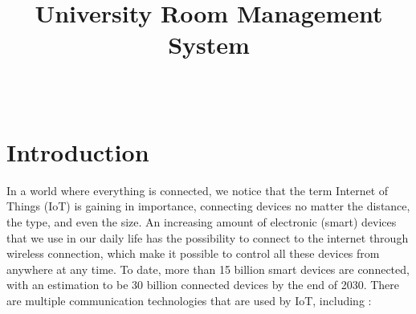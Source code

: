 \documentclass[conference,onecolumn]{IEEEtran}
\begin{document}
\title{University Room Management System\\} %

\author{\\ %

}

\maketitle


\newpage
\tableofcontents

\newpage
\section{Introduction}
In a world where everything is connected, we notice that the term Internet of Things (IoT) is gaining in importance, connecting devices no matter the distance, the type, and even the size. An increasing amount of electronic (smart) devices that we use in our daily life has the possibility to connect to the internet through wireless connection, which make it possible to control all these devices from anywhere at any time. To date, more than 15 billion smart devices are connected, with an estimation to be 30 billion connected devices by the end of 2030. There are multiple communication technologies that are used by IoT, including \cite{a1}:
\end{document}
